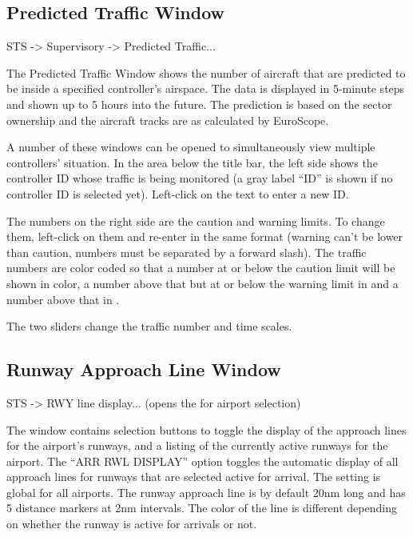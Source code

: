 \documentclass[a4paper,oneside,11pt]{memoir}
\begin{document}
\subsection{Predicted Traffic Window}
\label{win:ptw}

 STS -> Supervisory -> Predicted Traffic...

\bigskip

The Predicted Traffic Window shows the number of aircraft that are predicted to be inside a specified controller’s airspace. The data is displayed in 5-minute steps and shown up to 5 hours into the future. The prediction is based on the sector ownership and the aircraft tracks are as calculated by EuroScope.

\bigskip

A number of these windows can be opened to simultaneously view multiple controllers’ situation. In the area below the title bar, the left side shows the controller ID whose traffic is being monitored (a gray label “ID” is shown if no controller ID is selected yet). Left-click on the text to enter a new ID.

\bigskip

The numbers on the right side are the caution and warning limits. To change them, left-click on them and re-enter in the same format (warning can’t be lower than caution, numbers must be separated by a forward slash). The traffic numbers are color coded so that a number at or below the caution limit will be shown in  color, a number above that but at or below the warning limit in  and a number above that in .

\bigskip

The two sliders change the traffic number and time scales.

\subsection{Runway Approach Line Window}
\label{win:ralw}

 STS -> RWY line display... (opens the  for airport selection)

\bigskip


The window contains selection buttons to toggle the display of the approach lines for the airport’s runways, and a listing of the currently active runways for the airport. The “ARR RWL DISPLAY” option toggles the automatic display of all approach lines for runways that are selected active for arrival. The setting is global for all airports. The runway approach line is by default 20nm long and has 5 distance markers at 2nm intervals. The color of the line is different depending on whether the runway is active for arrivals or not.
\end{document}
